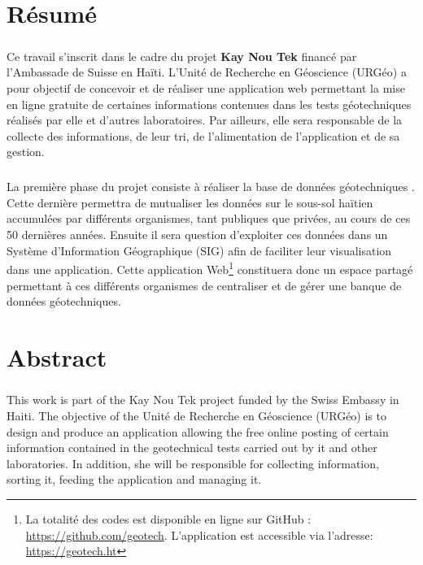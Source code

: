 \chapter*{Résumé}
\paragraph{}
Ce travail s'inscrit dans le cadre du projet \textbf{Kay Nou Tek}
financé par l’Ambassade de Suisse en Haïti. 
L'Unité de Recherche en Géoscience (URGéo) a pour objectif de concevoir et de réaliser
une application web permettant la mise en 
ligne gratuite de certaines informations contenues dans les tests 
géotechniques réalisés par elle et d’autres laboratoires.
Par ailleurs, elle sera responsable de la collecte des informations, de leur tri, de l’alimentation 
de l’application et de sa gestion. 
\paragraph{}
La première phase du projet consiste à réaliser la base de données géotechniques
. Cette dernière permettra de mutualiser les données 
 sur le sous-sol haïtien accumulées par différents organismes, tant publiques que privées, 
 au cours de ces 50 dernières années. Ensuite il sera question d'exploiter ces 
 données dans un Système d'Information Géographique (SIG)  afin de faciliter leur visualisation dans une application.
  Cette application 
 Web\footnote{ 
    La totalité des codes est disponible en ligne sur GitHub : 
    \url{https://github.com/geotech}.
    L’application est accessible via l’adresse: 
    \url{https://geotech.ht}
    }
 constituera donc un espace 
 partagé permettant à ces différents organismes de centraliser et de gérer une banque 
 de données géotechniques.


\newpage
\chapter*{Abstract}
\paragraph{}
This work is part of the Kay Nou Tek project funded by the Swiss 
Embassy in Haiti. The objective of the Unité de Recherche en Géoscience (URGéo) 
is to design and produce an application allowing the free online posting 
of certain information contained in the geotechnical tests carried out by 
it and other laboratories. In addition, she will be responsible for collecting 
information, sorting it, feeding the application and managing it.
